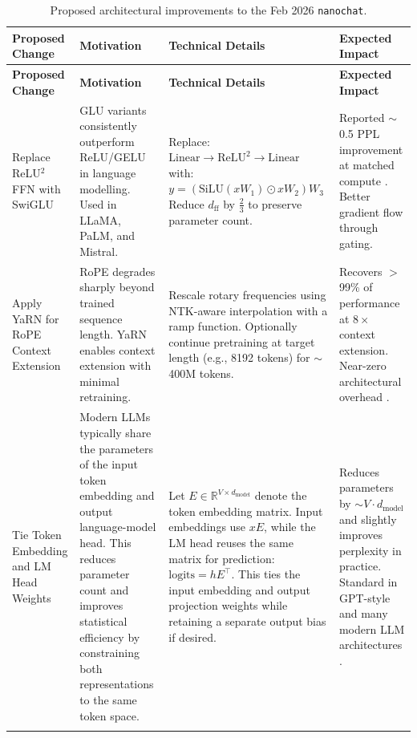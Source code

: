 \documentclass[a4paper,12pt]{article}
\begin{document}
\begin{longtable}{R{3.3cm} R{3.7cm} R{4.5cm} R{3.5cm}}
\toprule
\textbf{Proposed Change} & \textbf{Motivation} & \textbf{Technical Details} & \textbf{Expected Impact} \\
\midrule
\endfirsthead
\toprule
\textbf{Proposed Change} & \textbf{Motivation} & \textbf{Technical Details} & \textbf{Expected Impact} \\
\midrule
\endhead

Replace ReLU$^2$ FFN with SwiGLU &
GLU variants consistently outperform ReLU/GELU in language modelling. Used in LLaMA, PaLM, and Mistral. &
Replace:
$\text{Linear} \rightarrow \text{ReLU}^2 \rightarrow \text{Linear}$
with:
$y = (\text{SiLU}(xW_1) \odot xW_2)W_3$
Reduce $d_\mathrm{ff}$ by $\tfrac{2}{3}$ to preserve parameter count. &
Reported $\sim$0.5 PPL improvement at matched compute \cite{shazeer2020glu}. Better gradient flow through gating. \\
\midrule

Apply YaRN for RoPE Context Extension &
RoPE degrades sharply beyond trained sequence length. YaRN enables context extension with minimal retraining. &
Rescale rotary frequencies using NTK-aware interpolation with a ramp function. Optionally continue pretraining at target length (e.g., 8192 tokens) for $\sim$400M tokens. &
Recovers $>$99\% of performance at $8\times$ context extension. Near-zero architectural overhead \cite{peng2023yarn}. \\
\midrule

Tie Token Embedding and LM Head Weights &
Modern LLMs typically share the parameters of the input token embedding and output language-model head. This reduces parameter count and improves statistical efficiency by constraining both representations to the same token space. &
Let $E \in \mathbb{R}^{V \times d_\mathrm{model}}$ denote the token embedding matrix. Input embeddings use $xE$, while the LM head reuses the same matrix for prediction:
$\text{logits} = hE^\top$.
This ties the input embedding and output projection weights while retaining a separate output bias if desired. &
Reduces parameters by $\sim V \cdot d_\mathrm{model}$ and slightly improves perplexity in practice. Standard in GPT-style and many modern LLM architectures \cite{press2017using, inan2017tying}. \\
\bottomrule
\caption{Proposed architectural improvements to the Feb 2026 \texttt{nanochat}.}
\label{tab:proposed_changes}\\
\end{longtable}
\end{document}
